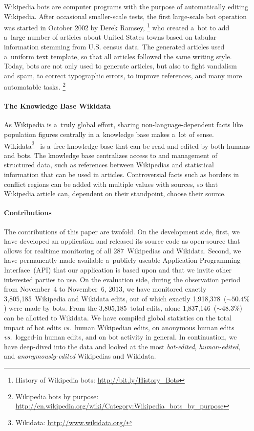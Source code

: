 \documentclass{sig-alternate}
\newcommand{\inlinelistingsize}{\fontsize{8pt}{11pt}}
\let\oldurl\url
\renewcommand{\url}[1]{\inlinelistingsize\oldurl{#1}}
\begin{document}
Wikipedia bots are computer programs
with the purpose of automatically editing Wikipedia.
After occasional smaller-scale tests,
the first large-scale bot operation
was started in October 2002 by Derek Ramsey,%
\footnote{History of Wikipedia bots:
\url{http://bit.ly/History_Bots}}
who created a~bot to add a~large number
of articles about United States towns
based on tabular information
stemming from U.S. census data.
The generated articles used a~uniform
text template, so that all articles
followed the same writing style.
Today, bots are not only used to generate articles,
but also to fight vandalism and spam,
to correct typographic errors,
to improve references, and many more automatable tasks.%
\footnote{Wikipedia bots by purpose: \url{http://en.wikipedia.org/wiki/Category:Wikipedia_bots_by_purpose}}

\paragraph{The Knowledge Base Wikidata}

As Wikipedia is a~truly global effort,
sharing non-language-dependent facts
like population figures centrally
in a~knowledge base makes a~lot of sense.
Wikidata\footnote{Wikidata: \url{http://www.wikidata.org/}}~\cite{vrandecic2012wikidata}
is a~free knowledge base that can be read
and edited by both humans and bots.
The knowledge base centralizes access to
and management of structured data,
such as references between Wikipedias
and statistical information that can be used in articles.
Controversial facts such as borders in conflict regions
can be added with multiple values with sources,
so that Wikipedia article can,
dependent on their standpoint, choose their source.

\paragraph{Contributions}

The contributions of this paper are twofold.
On the development side, first, we have developed an application
and released its source code as open-source
that allows for realtime monitoring of all 287~Wikipedias and Wikidata.
Second, we have permanently made available a~publicly useable
Application Programming Interface~(API) that our application
is based upon and that we invite other interested parties to use.
On the evaluation side, during the observation period
from November~4 to November~6, 2013,
we have monitored exactly
3,805,185~Wikipedia and Wikidata edits, 
out of which exactly 1,918,378~($\sim50.4\%$) were made by bots.
From the 3,805,185~total edits,
alone 1,837,146~($\sim48.3\%$) can be allotted to Wikidata.
We have compiled global statistics on the total impact of
bot edits \emph{vs.}\ human Wikipedian edits,
on anonymous human edits \emph{vs.}\ logged-in human edits,
and on bot activity in general.
In continuation, we have deep-dived into the data
and looked at the most \emph{bot-edited}, \emph{human-edited},
and \emph{anonymously-edited} Wikipedias and Wikidata.
\end{document}
